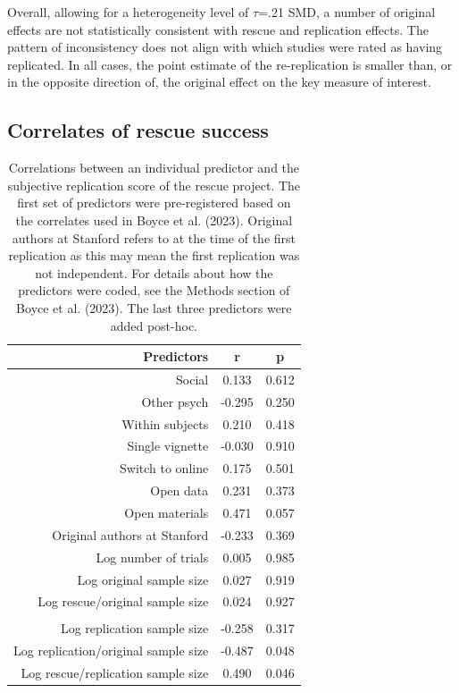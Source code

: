 \documentclass[
  english,
  a4paper,
]{article}
\begin{document}
Overall, allowing for a heterogeneity level of \(\tau\)=.21 SMD, a number of original effects are not statistically consistent with rescue and replication effects.
The pattern of inconsistency does not align with which studies were rated as having replicated.
In all cases, the point estimate of the re-replication is smaller than, or in the opposite direction of, the original effect on the key measure of interest.

\subsection{Correlates of rescue success}\label{correlates-of-rescue-success}

\begin{table}

\caption{\label{tab:cor-table}Correlations between an individual predictor and the subjective replication score of the rescue project. The first set of predictors were pre-registered based on the correlates used in Boyce et al. (2023). Original authors at Stanford refers to at the time of the first replication as this may mean the first replication was not independent. For details about how the predictors were coded, see the Methods section of Boyce et al. (2023). The last three predictors were added post-hoc.}
\centering
\begin{tabular}[t]{rcc}
\toprule
Predictors & r & p\\
\midrule
Social & 0.133 & 0.612\\
Other psych & -0.295 & 0.250\\
Within subjects & 0.210 & 0.418\\
Single vignette & -0.030 & 0.910\\
Switch to online & 0.175 & 0.501\\
Open data & 0.231 & 0.373\\
Open materials & 0.471 & 0.057\\
Original authors at Stanford & -0.233 & 0.369\\
Log number of trials & 0.005 & 0.985\\
Log original sample size & 0.027 & 0.919\\
Log rescue/original sample size & 0.024 & 0.927\\
\midrule\\
Log replication sample size & -0.258 & 0.317\\
Log replication/original sample size & -0.487 & 0.048\\
Log rescue/replication sample size & 0.490 & 0.046\\
\bottomrule
\end{tabular}
\end{table}
\end{document}
